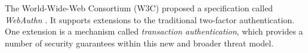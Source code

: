 The World-Wide-Web Consortium (W3C) proposed a specification called \textit{WebAuthn} \cite{webauthn}. It supports extensions to the traditional two-factor authentication. One extension is a mechanism called \textit{transaction authentication}, which provides a number of security guarantees within this new and broader threat model. 








